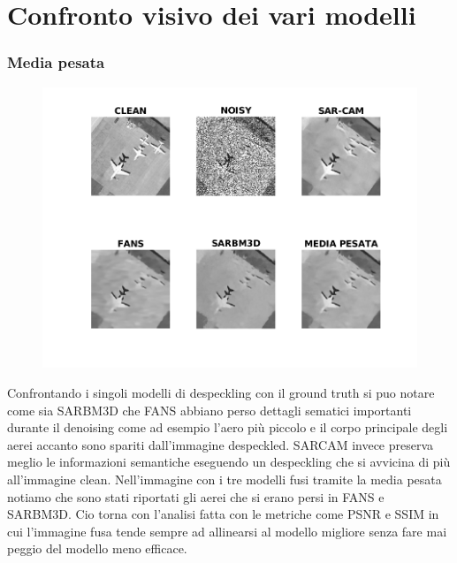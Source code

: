   \section{Confronto visivo dei vari modelli}
  \subsubsection{Media pesata}
  \begin{figure}[H]
    \centering
    \includegraphics[width=1.1\textwidth]{utils/MPairplane00.png}
    \caption{}
    \label{fig:airplane00MP}
  \end{figure}
Confrontando i singoli modelli di despeckling con il ground truth si puo notare come sia SARBM3D che FANS abbiano 
perso dettagli sematici importanti durante il denoising come ad esempio l'aero più piccolo e il corpo principale degli aerei accanto sono spariti dall'immagine despeckled.
SARCAM invece preserva meglio le informazioni semantiche eseguendo un despeckling che si avvicina di più all'immagine clean.
Nell'immagine con i tre modelli fusi tramite la media pesata notiamo che sono stati riportati gli aerei che si erano persi in FANS e SARBM3D. 
Cio torna con l'analisi fatta con le metriche come PSNR e SSIM in cui l'immagine fusa tende sempre ad allinearsi al modello migliore senza fare mai 
peggio del modello meno efficace.
